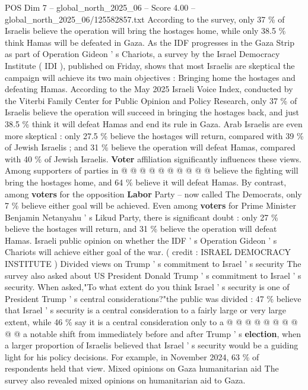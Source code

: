 \begin{textsample}{POS Dim 7 – global\_north\_2025\_06 – Score 4.00 – global\_north\_2025\_06/125582857.txt}  \label{ex:f7_pos_385}
According to the survey, only 37 \% of Israelis believe the operation will bring the hostages home, while only 38.5 \% think Hamas will be defeated in Gaza.
As the IDF progresses in the Gaza Strip as part of Operation Gideon ' s Chariots, a survey by the Israel Democracy Institute ( IDI ), published on Friday, shows that most Israelis are skeptical the campaign will achieve its two main objectives : Bringing home the hostages and defeating Hamas.
According to the May 2025 Israeli Voice Index, conducted by the Viterbi Family Center for Public Opinion and Policy Research, only 37 \% of Israelis believe the operation will succeed in bringing the hostages back, and just 38.5 \% think it will defeat Hamas and end its rule in Gaza.
Arab Israelis are even more skeptical : only 27.5 \% believe the hostages will return, compared with 39 \% of Jewish Israelis ; and 31 \% believe the operation will defeat Hamas, compared with 40 \% of Jewish Israelis. \textbf{Voter} affiliation significantly influences these views.
Among supporters of parties in @ @ @ @ @ @ @ @ @ @ believe the fighting will bring the hostages home, and 64 \% believe it will defeat Hamas.
By contrast, among \textbf{voters} for the opposition \textbf{Labor} Party -- now called The Democrats, only 7 \% believe either goal will be achieved.
Even among \textbf{voters} for Prime Minister Benjamin Netanyahu ' s Likud Party, there is significant doubt : only 27 \% believe the hostages will return, and 31 \% believe the operation will defeat Hamas.
Israeli public opinion on whether the IDF ' s Operation Gideon ' s Chariots will achieve either goal of the war. ( credit : ISRAEL DEMOCRACY INSTITUTE ) Divided views on Trump ' s commitment to Israel ' s security The survey also asked about US President Donald Trump ' s commitment to Israel ' s security.
When asked,"To what extent do you think Israel ' s security is one of President Trump ' s central considerations?"the public was divided : 47 \% believe that Israel ' s security is a central consideration to a fairly large or very large extent, while 46 \% say it is a central consideration only to a @ @ @ @ @ @ @ @ @ @ a notable shift from immediately before and after Trump ' s \textbf{election}, when a larger proportion of Israelis believed that Israel ' s security would be a guiding light for his policy decisions.
For example, in November 2024, 63 \% of respondents held that view.
Mixed opinions on Gaza humanitarian aid The survey also revealed mixed opinions on humanitarian aid to Gaza.

\end{textsample}
